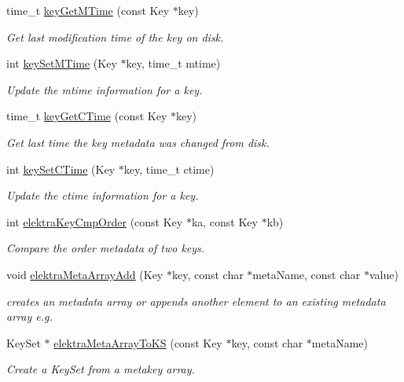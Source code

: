 \begin{DoxyCompactItemize}
time\+\_\+t \hyperlink{group__meta_ga57689eb5691679071463b777ae786ae9}{key\+Get\+M\+Time} (const Key $\ast$key)
\begin{DoxyCompactList}\small\item\em Get last modification time of the key on disk. \end{DoxyCompactList}\item 
int \hyperlink{group__meta_ga481d8997187992fe4bbf288bc8ef4db7}{key\+Set\+M\+Time} (Key $\ast$key, time\+\_\+t mtime)
\begin{DoxyCompactList}\small\item\em Update the mtime information for a key. \end{DoxyCompactList}\item 
time\+\_\+t \hyperlink{group__meta_ga2c213c120cbe02201278ef7fb8cd94be}{key\+Get\+C\+Time} (const Key $\ast$key)
\begin{DoxyCompactList}\small\item\em Get last time the key metadata was changed from disk. \end{DoxyCompactList}\item 
int \hyperlink{group__meta_ga9f502ecab8ab43f0b17220fcc95f3fa5}{key\+Set\+C\+Time} (Key $\ast$key, time\+\_\+t ctime)
\begin{DoxyCompactList}\small\item\em Update the ctime information for a key. \end{DoxyCompactList}\item 
int \hyperlink{group__meta_gab8b30dfabb0867bd6899e60e7bd193a2}{elektra\+Key\+Cmp\+Order} (const Key $\ast$ka, const Key $\ast$kb)
\begin{DoxyCompactList}\small\item\em Compare the order metadata of two keys. \end{DoxyCompactList}\item 
void \hyperlink{group__meta_ga166c65c4eb2d758ced57b0bd74fb9a57}{elektra\+Meta\+Array\+Add} (Key $\ast$key, const char $\ast$meta\+Name, const char $\ast$value)
\begin{DoxyCompactList}\small\item\em creates an metadata array or appends another element to an existing metadata array e.\+g. \end{DoxyCompactList}\item 
Key\+Set $\ast$ \hyperlink{group__meta_ga57e189e739d942d60bb83765ced5cef2}{elektra\+Meta\+Array\+To\+KS} (const Key $\ast$key, const char $\ast$meta\+Name)
\begin{DoxyCompactList}\small\item\em Create a {\ttfamily Key\+Set} from a metakey array. \end{DoxyCompactList}\item 

\end{DoxyCompactItemize}
